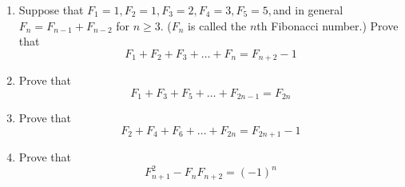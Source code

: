 \documentclass[12pt]{article}
\begin{document}
\begin{enumerate}
  \item Suppose that $F_1=1, F_2=1,F_3=2,F_4=3,F_5=5,$and in general$F_n = F_{n-1}+F_{n-2}$ for $n \ge 3$. ($F_n$ is called the $n$th Fibonacci number.) Prove that
    \[
    F_1 + F_2 + F_3 + \ldots + F_n = F_{n+2} - 1
    \]

  \item Prove that
    \[
    F_1 + F_3 + F_5 + \ldots + F_{2n-1} = F_{2n}
    \]

  \item Prove that
    \[
    F_2 + F_4 + F_6 + \ldots + F_{2n} = F_{2n+1} - 1
    \]

  \item Prove that
    \[
    F_{n+1}^2 - F_nF_{n+2} = (-1)^n
    \]
\end{enumerate}
\end{document}
